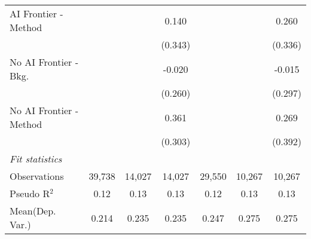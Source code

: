 \begin{tabular}{lcccccc}
   AI Frontier - Method    &               &               & 0.140        &               &               & 0.260\\   
                           &               &               & (0.343)      &               &               & (0.336)\\   
   No AI Frontier - Bkg.   &               &               & -0.020       &               &               & -0.015\\   
                           &               &               & (0.260)      &               &               & (0.297)\\   
   No AI Frontier - Method &               &               & 0.361        &               &               & 0.269\\   
                           &               &               & (0.303)      &               &               & (0.392)\\   
   \midrule
   \emph{Fit statistics}\\
   Observations            & 39,738        & 14,027        & 14,027       & 29,550        & 10,267        & 10,267\\  
   Pseudo R$^2$            & 0.12          & 0.13          & 0.13         & 0.12          & 0.13          & 0.13\\  
Mean(Dep. Var.) & 0.214 & 0.235 & 0.235 & 0.247 & 0.275 & 0.275 \\
   

\end{tabular}
